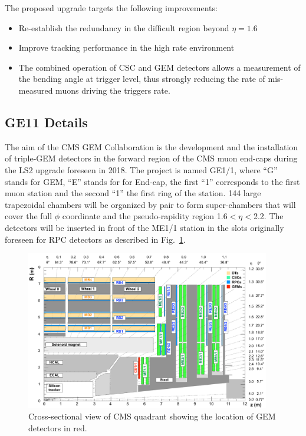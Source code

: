 The proposed upgrade targets the following improvements:
	\begin{itemize}
		\item Re-establish the redundancy in the difficult region beyond $\eta = 1.6 $
		\item Improve tracking performance in the high rate environment
		\item The combined operation of CSC and GEM detectors allows a measurement of the bending angle at trigger level, thus strongly reducing the rate of mis-measured muons driving the triggers rate.
	\end{itemize}

\subsection{GE11 Details}
The aim of the CMS GEM Collaboration is the development and the installation of triple-GEM detectors in the forward region of the CMS muon end-caps during the LS2 upgrade foreseen in 2018. The project is named GE1/1, where ``G'' stands for GEM, ``E'' stands for for End-cap, the first ``1'' corresponds to the first muon station and the second ``1'' the first ring of the station. 144 large trapezoidal chambers will be organized by pair to form super-chambers that will cover the full $\phi$ coordinate and the pseudo-rapidity region 1.6$ < \eta < $2.2.
The detectors will be inserted in front of the ME1/1 station in the slots originally foreseen for RPC detectors as described in Fig.~\ref{fig:GE11pos}. 
\begin{figure}[!htbp]
	\centering
	\includegraphics[width=0.95\textwidth]{figures/GEM/cms_upg_o_g_b_ni_ge1_r_140227.pdf}
	\caption{Cross-sectional view of CMS quadrant showing the location of GEM detectors in red.}
	\label{fig:GE11pos}
\end{figure}
